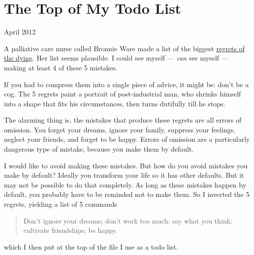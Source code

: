 \chapter{The Top of My Todo List}


            
              
                

April 2012

A palliative care nurse called Bronnie
                  Ware made a list of the biggest
                  \href{http://bronnieware.com/regrets-of-the-dying/}{regrets of the dying}. Her list seems plausible. I could see myself ---
                  \emph{can} see myself --- making at least 4 of these 5
                  mistakes.

If you had to compress them into a single
                  piece of advice, it might be: don't be a cog. The 5 regrets
                  paint a portrait of post-industrial man, who shrinks himself
                  into a shape that fits his circumstances, then turns dutifully
                  till he stops.

The alarming thing is, the mistakes
                  that produce these regrets are all errors of omission. You
                  forget your dreams, ignore your family, suppress your
                  feelings, neglect your friends, and forget to be happy. Errors
                  of omission are a particularly dangerous type of mistake,
                  because you make them by default.

I would like to
                  avoid making these mistakes. But how do you avoid mistakes you
                  make by default? Ideally you transform your life so it has
                  other defaults. But it may not be possible to do that
                  completely. As long as these mistakes happen by default, you
                  probably have to be reminded not to make them. So I inverted
                  the 5 regrets, yielding a list of 5 commands
                  \begin{quote}

                    Don't ignore your dreams; don't work too much; say what you
                    think; cultivate friendships; be happy.
                  
\end{quote}

                  which I then put at the top of the file I use as a todo
                  list.


              
            
          
